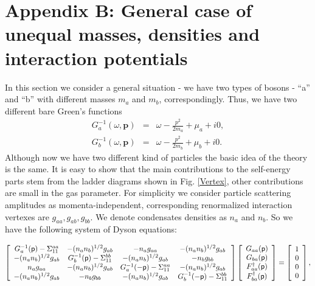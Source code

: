 \documentclass[reprint,superscriptaddress,showpacs,nofootinbib,aps,pra]{revtex4-1}
\begin{document}
\section*{Appendix B: General case of unequal masses, densities and interaction potentials}

In this section we consider a general situation - we have two types of bosons - ``a'' and ``b'' with different masses $m_a$ and $m_b$, correspondingly. Thus, we have two different bare Green's functions
\begin{eqnarray}
 \label{Ga1}
  G^{-1}_a(\omega, \textbf{p}) &=& \omega - \frac{p^2}{2m_a} +\mu_a +i0,  \\ \label{Ga2}
  G^{-1}_b(\omega, \textbf{p}) &=& \omega - \frac{p^2}{2m_b} +\mu_b +i0. 
\end{eqnarray}
Although now we have two different kind of particles the basic idea of the theory is the same. It is easy to show that the main contributions to the self-energy parts stem from the ladder diagrams shown in Fig. \ref{Vertex}, other contributions are small in the gas parameter. For simplicity we consider particle scattering amplitudes as momenta-independent, corresponding renormalized interaction vertexes are $g_{aa}, g_{ab}, g_{bb}$. We denote condensates densities as $n_a$ and $n_b$. So we have the following system of Dyson equations:
\begin{widetext}
\begin{equation}\label{Matr3}
  \left[
    \begin{array}{cccc}
      G^{-1}_a(\mathsf p) - \Sigma^{aa}_{11} & -(n_a n_b)^{1/2} g_{ab} & - n_a g_{aa} &  -(n_a n_b)^{1/2} g_{ab}\\
      -(n_a n_b)^{1/2} g_{ab} & G^{-1}_b(\mathsf p) - \Sigma^{bb}_{11} & -(n_a n_b)^{1/2} g_{ab} & - n_b g_{bb} \\
      n_a g_{aa} & -(n_a n_b)^{1/2} g_{ab} & G^{-1}_a(-\mathsf p) - \Sigma^{aa}_{11} & -\-(n_a n_b)^{1/2} g_{ab} \\
      -(n_a n_b)^{1/2} g_{ab} & - n_b g_{bb} & -(n_a n_b)^{1/2} g_{ab} & G^{-1}_b(-\mathsf p) - \Sigma^{bb}_{11} \\
    \end{array}
  \right] \left[
            \begin{array}{c}
              G_{aa}(\mathsf p) \\
              G_{ba}(\mathsf p) \\
              F^\dag_{aa}(\mathsf p) \\
              F^\dag_{ba}(\mathsf p) \\
            \end{array}
          \right]
          = \left[
              \begin{array}{c}
                1 \\
                0 \\
                0 \\
                0 \\
              \end{array}
            \right],
\end{equation}
\end{widetext}
\end{document}
